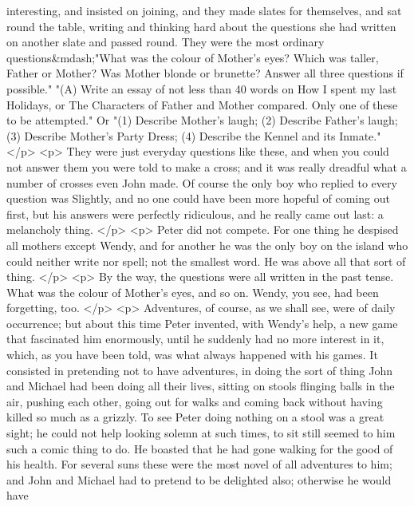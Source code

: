       interesting, and insisted on joining, and they made slates for themselves,
      and sat round the table, writing and thinking hard about the questions she
      had written on another slate and passed round. They were the most ordinary
      questions&mdash;"What was the colour of Mother's eyes? Which was taller,
      Father or Mother? Was Mother blonde or brunette? Answer all three
      questions if possible." "(A) Write an essay of not less than 40 words on
      How I spent my last Holidays, or The Characters of Father and Mother
      compared. Only one of these to be attempted." Or "(1) Describe Mother's
      laugh; (2) Describe Father's laugh; (3) Describe Mother's Party Dress; (4)
      Describe the Kennel and its Inmate."
    </p>
    <p>
      They were just everyday questions like these, and when you could not
      answer them you were told to make a cross; and it was really dreadful what
      a number of crosses even John made. Of course the only boy who replied to
      every question was Slightly, and no one could have been more hopeful of
      coming out first, but his answers were perfectly ridiculous, and he really
      came out last: a melancholy thing.
    </p>
    <p>
      Peter did not compete. For one thing he despised all mothers except Wendy,
      and for another he was the only boy on the island who could neither write
      nor spell; not the smallest word. He was above all that sort of thing.
    </p>
    <p>
      By the way, the questions were all written in the past tense. What was the
      colour of Mother's eyes, and so on. Wendy, you see, had been forgetting,
      too.
    </p>
    <p>
      Adventures, of course, as we shall see, were of daily occurrence; but
      about this time Peter invented, with Wendy's help, a new game that
      fascinated him enormously, until he suddenly had no more interest in it,
      which, as you have been told, was what always happened with his games. It
      consisted in pretending not to have adventures, in doing the sort of thing
      John and Michael had been doing all their lives, sitting on stools
      flinging balls in the air, pushing each other, going out for walks and
      coming back without having killed so much as a grizzly. To see Peter doing
      nothing on a stool was a great sight; he could not help looking solemn at
      such times, to sit still seemed to him such a comic thing to do. He
      boasted that he had gone walking for the good of his health. For several
      suns these were the most novel of all adventures to him; and John and
      Michael had to pretend to be delighted also; otherwise he would have
